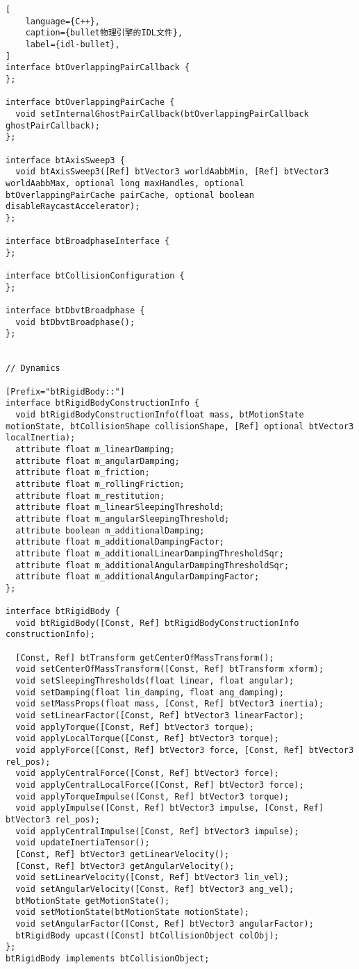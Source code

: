 \begin{lstlisting}[
    language={C++},
    caption={bullet物理引擎的IDL文件},
    label={idl-bullet},
]
interface btOverlappingPairCallback {
};

interface btOverlappingPairCache {
  void setInternalGhostPairCallback(btOverlappingPairCallback ghostPairCallback);
};

interface btAxisSweep3 {
  void btAxisSweep3([Ref] btVector3 worldAabbMin, [Ref] btVector3 worldAabbMax, optional long maxHandles, optional btOverlappingPairCache pairCache, optional boolean disableRaycastAccelerator);
};

interface btBroadphaseInterface {
};

interface btCollisionConfiguration {
};

interface btDbvtBroadphase {
  void btDbvtBroadphase();
};


// Dynamics

[Prefix="btRigidBody::"]
interface btRigidBodyConstructionInfo {
  void btRigidBodyConstructionInfo(float mass, btMotionState motionState, btCollisionShape collisionShape, [Ref] optional btVector3 localInertia);
  attribute float m_linearDamping;
  attribute float m_angularDamping;
  attribute float m_friction;
  attribute float m_rollingFriction;
  attribute float m_restitution;
  attribute float m_linearSleepingThreshold;
  attribute float m_angularSleepingThreshold;
  attribute boolean m_additionalDamping;
  attribute float m_additionalDampingFactor;
  attribute float m_additionalLinearDampingThresholdSqr;
  attribute float m_additionalAngularDampingThresholdSqr;
  attribute float m_additionalAngularDampingFactor;
};

interface btRigidBody {
  void btRigidBody([Const, Ref] btRigidBodyConstructionInfo constructionInfo);

  [Const, Ref] btTransform getCenterOfMassTransform();
  void setCenterOfMassTransform([Const, Ref] btTransform xform);
  void setSleepingThresholds(float linear, float angular);
  void setDamping(float lin_damping, float ang_damping);
  void setMassProps(float mass, [Const, Ref] btVector3 inertia);
  void setLinearFactor([Const, Ref] btVector3 linearFactor);
  void applyTorque([Const, Ref] btVector3 torque);
  void applyLocalTorque([Const, Ref] btVector3 torque);
  void applyForce([Const, Ref] btVector3 force, [Const, Ref] btVector3 rel_pos);
  void applyCentralForce([Const, Ref] btVector3 force);
  void applyCentralLocalForce([Const, Ref] btVector3 force);
  void applyTorqueImpulse([Const, Ref] btVector3 torque);
  void applyImpulse([Const, Ref] btVector3 impulse, [Const, Ref] btVector3 rel_pos);
  void applyCentralImpulse([Const, Ref] btVector3 impulse);
  void updateInertiaTensor();
  [Const, Ref] btVector3 getLinearVelocity();
  [Const, Ref] btVector3 getAngularVelocity();
  void setLinearVelocity([Const, Ref] btVector3 lin_vel);
  void setAngularVelocity([Const, Ref] btVector3 ang_vel);
  btMotionState getMotionState();
  void setMotionState(btMotionState motionState);
  void setAngularFactor([Const, Ref] btVector3 angularFactor);
  btRigidBody upcast([Const] btCollisionObject colObj);
};
btRigidBody implements btCollisionObject;


\end{lstlisting}
